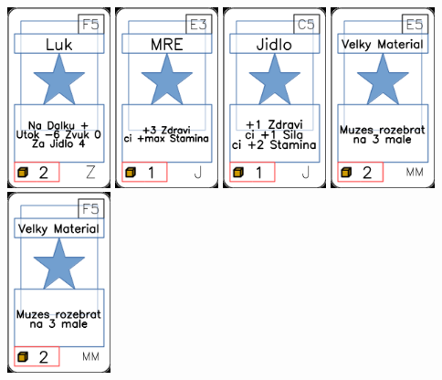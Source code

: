 \documentclass[a4paper]{article}
\begin{document}
	\includegraphics[width=3.0cm]{img-1_89}
	\includegraphics[width=3.0cm]{img-1_22}
	\includegraphics[width=3.0cm]{img-1_14}
	\includegraphics[width=3.0cm]{img-1_54}
	\includegraphics[width=3.0cm]{img-1_59}
\end{document}
